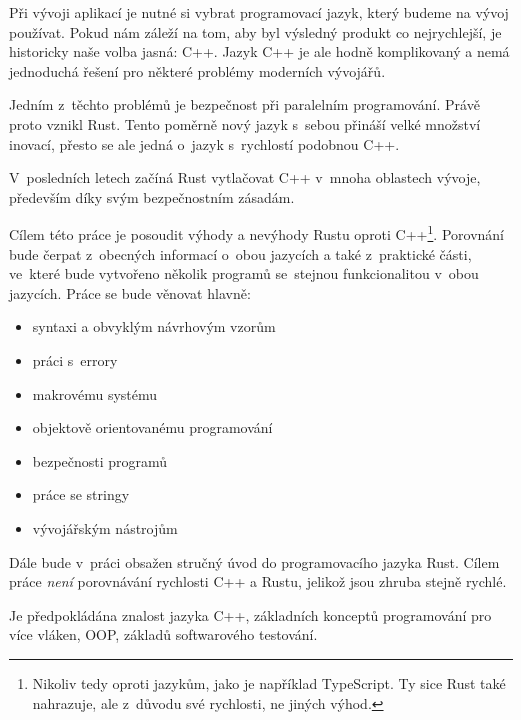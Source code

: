 \documentclass[main.tex]{subfiles}
\begin{document}


Při vývoji aplikací je nutné si vybrat programovací jazyk, který budeme na vývoj
používat. Pokud nám záleží na tom, aby byl výsledný produkt co nejrychlejší,
je historicky naše volba jasná: C++. Jazyk C++ je ale hodně komplikovaný a nemá
jednoduchá řešení pro některé problémy moderních vývojářů.

Jedním z~těchto problémů je bezpečnost při paralelním programování. Právě proto
vznikl Rust. Tento poměrně nový jazyk s~sebou přináší velké množství inovací, přesto
se ale jedná o~jazyk s~rychlostí podobnou C++.

V~posledních letech začíná Rust vytlačovat C++ v~mnoha oblastech vývoje, především
díky svým bezpečnostním zásadám.


Cílem této práce je posoudit výhody a nevýhody Rustu oproti C++\footnote{Nikoliv
    tedy oproti jazykům, jako je například TypeScript. Ty sice Rust také nahrazuje,
    ale z~důvodu své rychlosti, ne jiných výhod.
}. Porovnání bude čerpat z~obecných informací o~obou jazycích a také z~praktické části,
ve~které bude vytvořeno několik programů se~stejnou funkcionalitou v~obou jazycích.
Práce se bude věnovat hlavně:
\begin{itemize}
    \item syntaxi a obvyklým návrhovým vzorům
    \item práci s~errory
    \item makrovému systému
    \item objektově orientovanému programování
    \item bezpečnosti programů
    \item práce se stringy
    \item vývojářským nástrojům
\end{itemize}

Dále bude v~práci obsažen stručný úvod do programovacího jazyka Rust. Cílem práce
\emph{není} porovnávání rychlosti C++ a Rustu, jelikož jsou zhruba stejně rychlé.


Je předpokládána znalost jazyka C++, základních konceptů programování pro více vláken,
OOP, základů softwarového testování.
\end{document}
